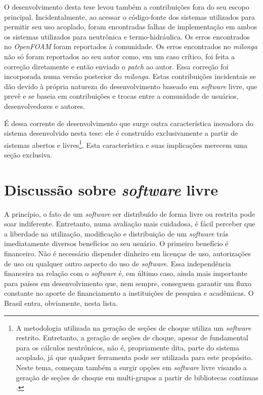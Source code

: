 O desenvolvimento desta tese levou também a contribuições fora do seu escopo principal.
Incidentalmente, ao acessar o código-fonte dos sistemas utilizados para permitir seu
uso acoplado, foram encontradas
falhas de implementação em ambos os sistemas utilizados para neutrônica e termo-hidráulica.
Os erros encontrados no \textit{OpenFOAM} foram reportados à comunidade.
Os erros encontrados no \textit{milonga} não só foram reportados ao seu autor como,
em um caso crítico, foi feita a correção diretamente e então enviado o \textit{patch} ao autor.
Essa correção foi incorporada numa versão posterior do \textit{milonga}.
Estas contribuições incidentais se dão devido à própria natureza do desenvolvimento baseado
em \textit{software} livre, que prevê e se baseia em contribuições e trocas entre a comunidade
de usuários, desenvolvedores e autores.

É dessa corrente de desenvolvimento que surge outra característica inovadora
do sistema desenvolvido nesta tese: ele é construído exclusivamente a partir
de sistemas abertos e livres\footnote{A metodologia utilizada
  na geração de seções de choque utiliza um \textit{software} restrito. Entretanto, a geração
  de seções de choque, apesar de fundamental para os cálculos neutrônicos, não é, propriamente dita,
  parte do sistema acoplado, já que qualquer ferramenta pode ser utilizada para este propósito. Neste tema, começam também a surgir opções em \textit{software} livre
  visando a geração de seções de choque em multi-grupos a partir de bibliotecas contínuas \cite{Slaybaugh2014}.}.
Esta característica e suas implicações merecem uma seção exclusiva.


\section{Discussão sobre \textit{software} livre}

A princípio, o fato de um \textit{software} ser distribuído de forma livre ou restrita pode soar indiferente.
Entretanto, numa avaliação mais cuidadosa, é fácil
perceber que a liberdade na utilização, modificação e distribuição de um \textit{software} trás imediatamente
diversos benefícios ao seu usuário. O primeiro
benefício é financeiro. Não é necessário dispender dinheiro em licenças de uso, autorizações de uso ou
qualquer outro aspecto do uso de \textit{software}. Essa independência financeira na relação com o \textit{software} é, em último caso,
ainda mais importante para países em desenvolvimento que, nem sempre, conseguem garantir um fluxo constante
no aporte de financiamento a instituições de pesquisa e acadêmicas. O Brasil entra, obviamente, nesta lista.

